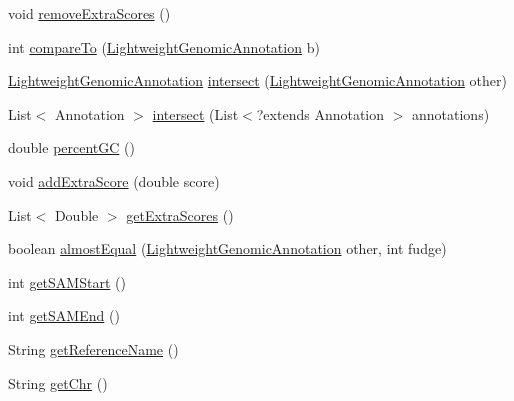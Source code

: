 \begin{DoxyCompactItemize}
\item 
void \hyperlink{classbroad_1_1core_1_1sequence_1_1_sequence_region_a882c2a74f254a0b0f43c2e516241737c}{remove\+Extra\+Scores} ()
\item 
int \hyperlink{classbroad_1_1core_1_1sequence_1_1_sequence_region_a5544f2e051b5f8806396fc264e9d3a50}{compare\+To} (\hyperlink{interfacebroad_1_1core_1_1annotation_1_1_lightweight_genomic_annotation}{Lightweight\+Genomic\+Annotation} b)
\item 
\hyperlink{interfacebroad_1_1core_1_1annotation_1_1_lightweight_genomic_annotation}{Lightweight\+Genomic\+Annotation} \hyperlink{classbroad_1_1core_1_1sequence_1_1_sequence_region_a9bd036c43990c3529b4cd6886d1b36eb}{intersect} (\hyperlink{interfacebroad_1_1core_1_1annotation_1_1_lightweight_genomic_annotation}{Lightweight\+Genomic\+Annotation} other)
\item 
List$<$ Annotation $>$ \hyperlink{classbroad_1_1core_1_1sequence_1_1_sequence_region_a681b97cb000bd45aacf1361357018273}{intersect} (List$<$?extends Annotation $>$ annotations)
\item 
double \hyperlink{classbroad_1_1core_1_1sequence_1_1_sequence_region_aacbc690177c48e767b09a24d0e3cdbdc}{percent\+G\+C} ()
\item 
void \hyperlink{classbroad_1_1core_1_1sequence_1_1_sequence_region_a23c88ad5ace31a8f3f1d8044ee0f1257}{add\+Extra\+Score} (double score)
\item 
List$<$ Double $>$ \hyperlink{classbroad_1_1core_1_1sequence_1_1_sequence_region_a64d2b48939f4a42d9b1ba307ef7f8d55}{get\+Extra\+Scores} ()
\item 
boolean \hyperlink{classbroad_1_1core_1_1sequence_1_1_sequence_region_a642bc49cb89cd677df39a440e19191f6}{almost\+Equal} (\hyperlink{interfacebroad_1_1core_1_1annotation_1_1_lightweight_genomic_annotation}{Lightweight\+Genomic\+Annotation} other, int fudge)
\item 
int \hyperlink{classbroad_1_1core_1_1sequence_1_1_sequence_region_ab8bdec52b791c752123dbcb2f853a648}{get\+S\+A\+M\+Start} ()
\item 
int \hyperlink{classbroad_1_1core_1_1sequence_1_1_sequence_region_a167dc4949f97136d3a0c7c2ff24621c7}{get\+S\+A\+M\+End} ()
\item 
String \hyperlink{classbroad_1_1core_1_1sequence_1_1_sequence_region_a3ef8c9ab35ce4e0033488dfaa45fe5be}{get\+Reference\+Name} ()
\item 
String \hyperlink{classbroad_1_1core_1_1sequence_1_1_sequence_region_a83746b3145789378233bc9fc66df4f46}{get\+Chr} ()

\end{DoxyCompactItemize}
